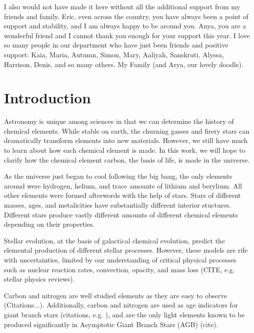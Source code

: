 \documentclass[12pt,oneside]{report}
\begin{document}
I also would not have made it here without all the additional support from my friends and family. Eric, even across the country, you have always been a point of support and stability, and I am always happy to be around you. Anya, you are a wonderful friend and I cannot thank you enough for your support this year. 
I love so many people in our department who have just been friends and positive support: Kaia, Maria, Autumn, Simon, Mary, Aaliyah, Sanskruti, Alyssa, Harrison, Denis, and so many others. 
My Family (and Arya, our lovely doodle).



\tableofcontents
\listoffigures
\listoftables
\newpage
{}



\chapter{Introduction}


Astronomy is unique among sciences in that we can determine the history of chemical elements. While stable on earth, the churning gasses and firery stars can dramatically transform elements into new materials. However, we still have much to learn about how each chemical element is made. In this work, we will hope to clarify how the chemical element carbon, the basis of life, is made in the universe.

As the universe just began to cool following the big bang, the only elements around were hydrogen, helium, and trace amounts of lithium and berylium. All other elements were formed afterwords with the help of stars. Stars of different masses, ages, and metalicities have substantially different interior stuctures. Different stars produce vastly different amounts of different chemical elements depending on their properties. 

Stellar evolution, at the basis of galactical chemical evolution, predict the elemental production of different stellar processes. 
However, these models are rife with uncertainties, limited by our understanding of critical physical processes such as nuclear reaction rates, convection, opacity, and mass loss (CITE, e.g. stellar physics reviews). 

Carbon and nitrogen are well studied elements as they are easy to observe (Citations...). Additionally, carbon and nitrogen are used as age indicators for giant branch stars (citations, e.g. \cite{fiorenzo+21}), and are the only light elements known to be produced significantly in Asymptotic Giant Branch Stars (AGB) (cite).
\end{document}
